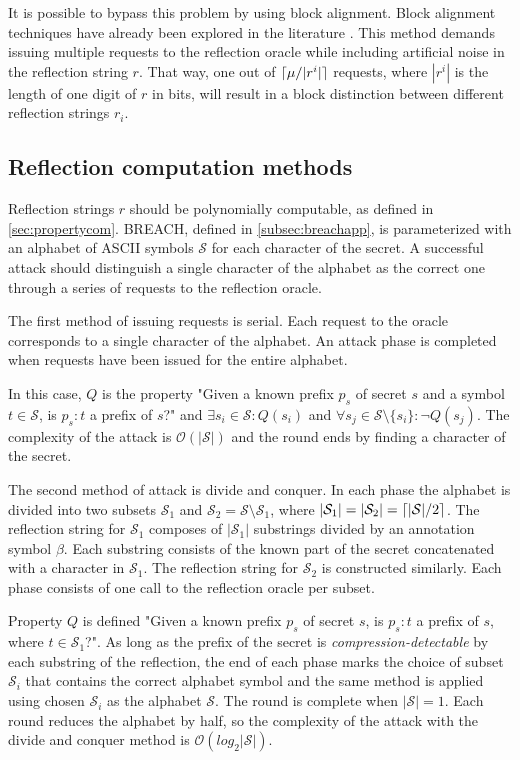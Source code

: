 \documentclass[conference, letterpaper, 10pt]{IEEEtran}
\DeclarePairedDelimiter{\ceil}{\lceil}{\rceil}
\begin{document}
It is possible to bypass this problem by using block alignment. Block alignment
techniques have already been explored in the literature \cite{c14}.  This method
demands issuing multiple requests to the reflection oracle while including
artificial noise in the reflection string $r$.  That way, one out of
$\ceil{\mu / |r^i|}$ requests, where $|r^i|$ is the length of one digit of
$r$ in bits, will result in a block distinction between different reflection
strings $r_i$.

\subsection{Reflection computation methods}\label{subsec:reflectionmethods}
Reflection strings $r$ should be polynomially computable, as defined in
\ref{sec:propertycom}. BREACH, defined in \ref{subsec:breachapp}, is
parameterized with an alphabet of ASCII symbols $\mathcal{S}$ for each character of the
secret. A successful attack should distinguish a single character of the
alphabet as the correct one through a series of requests to the reflection
oracle.

The first method of issuing requests is serial. Each request to the oracle
corresponds to a single character of the alphabet. An attack phase is completed
when requests have been issued for the entire alphabet.

In this case, $Q$ is the property "Given a known prefix $p_s$ of secret $s$ and
a symbol $t \in \mathcal{S}$, is $p_s:t$ a prefix of $s$?" and $\exists
s_i \in \mathcal{S}: Q(s_i)$ and $\forall s_j \in \mathcal{S} \setminus \{s_i\}:
\lnot Q(s_j)$. The complexity of the attack is $\mathcal{O}(|\mathcal{S}|)$ and
the round ends by finding a character of the secret.

The second method of attack is divide and conquer. In each phase the alphabet is
divided into two subsets $\mathcal{S}_1$ and $\mathcal{S}_2 = \mathcal{S}
\setminus \mathcal{S}_1$, where $|\mathcal{S}_1| = |\mathcal{S}_2| =
\ceil{|\mathcal{S}| / 2}$. The reflection string for $\mathcal{S}_1$ composes of
$|\mathcal{S}_1|$ substrings divided by an annotation symbol $\beta$. Each
substring consists of the known part of the secret concatenated with a character
in $\mathcal{S}_1$. The reflection string for $\mathcal{S}_2$ is constructed
similarly. Each phase consists of one call to the reflection oracle per subset.

Property $Q$ is defined "Given a known prefix $p_s$ of secret $s$, is $p_s:t$ a
prefix of $s$, where $t \in \mathcal{S}_1$?". As long as the prefix of the
secret is \textit{compression-detectable} by each substring of the reflection,
the end of each phase marks the choice of subset $\mathcal{S}_i$ that contains
the correct alphabet symbol and the same method is applied using chosen
$\mathcal{S}_i$ as the alphabet $\mathcal{S}$. The round is complete when
$|\mathcal{S}| = 1$. Each round reduces the alphabet by half, so the complexity
of the attack with the divide and conquer method  is
$\mathcal{O}(log_2|\mathcal{S}|)$.
\end{document}
